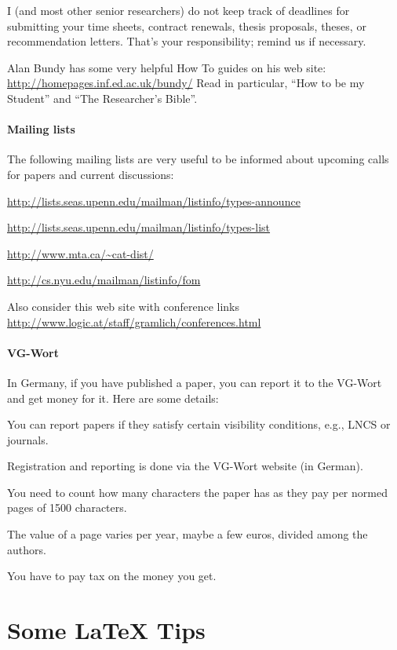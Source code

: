 \documentclass[12pt]{article}
\begin{document}
I (and most other senior researchers) do not keep track of deadlines for submitting your time sheets, contract renewals, thesis proposals, theses, or recommendation letters. That's your responsibility; remind us if necessary.
\medskip

Alan Bundy has some very helpful How To guides on his web site: \url{http://homepages.inf.ed.ac.uk/bundy/} Read in particular, ``How to be my Student'' and ``The Researcher's Bible''.

\paragraph{Mailing lists}
The following mailing lists are very useful to be informed about upcoming calls for papers and current discussions:
\begin{compactitem}
\item \url{http://lists.seas.upenn.edu/mailman/listinfo/types-announce}
\item \url{http://lists.seas.upenn.edu/mailman/listinfo/types-list}
\item \url{http://www.mta.ca/~cat-dist/}
\item \url{http://cs.nyu.edu/mailman/listinfo/fom}
\end{compactitem}

Also consider this web site with conference links
\url{http://www.logic.at/staff/gramlich/conferences.html}

\paragraph{VG-Wort}
In Germany, if you have published a paper, you can report it to the VG-Wort and get money for it. Here are some details:
\begin{compactitem}
\item You can report papers if they satisfy certain visibility conditions, e.g., LNCS or journals.
\item Registration and reporting is done via the VG-Wort website (in German).
\item You need to count how many characters the paper has as they pay per normed pages of 1500 characters.
\item The value of a page varies per year, maybe a few euros, divided among the authors.
\item You have to pay tax on the money you get.
\end{compactitem}

\section{Some LaTeX Tips}
\end{document}

